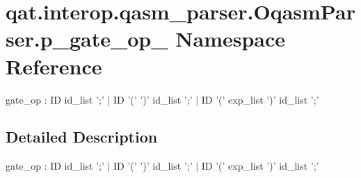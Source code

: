 \hypertarget{namespaceqat_1_1interop_1_1qasm__parser_1_1OqasmParser_1_1p__gate__op__2}{\section{qat.\-interop.\-qasm\-\_\-parser.\-Oqasm\-Parser.\-p\-\_\-gate\-\_\-op\-\_ Namespace Reference}
\label{namespaceqat_1_1interop_1_1qasm__parser_1_1OqasmParser_1_1p__gate__op__2}
}


gate\-\_\-op \-: I\-D id\-\_\-list ';' $|$ I\-D '(' ')' id\-\_\-list ';' $|$ I\-D '(' exp\-\_\-list ')' id\-\_\-list ';'  




\subsection{Detailed Description}
gate\-\_\-op \-: I\-D id\-\_\-list ';' $|$ I\-D '(' ')' id\-\_\-list ';' $|$ I\-D '(' exp\-\_\-list ')' id\-\_\-list ';' 
